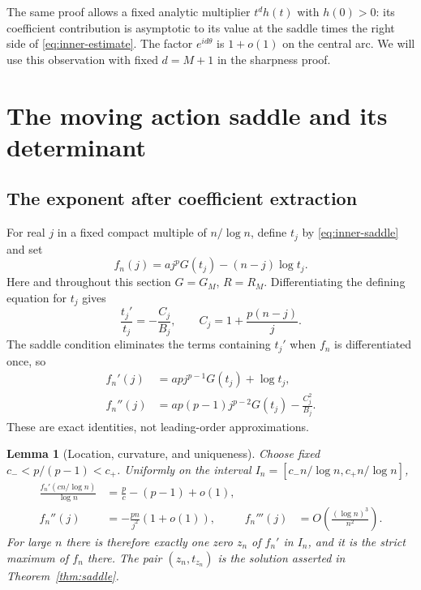 \documentclass[11pt,a4paper]{article}
\numberwithin{equation}{section}
\newtheorem{lemma}[theorem]{Lemma}
\theoremstyle{definition}
\theoremstyle{remark}
\begin{document}
The same proof allows a fixed analytic multiplier $t^d h(t)$ with
$h(0)>0$: its coefficient contribution is asymptotic to its value at the
saddle times the right side of \eqref{eq:inner-estimate}. The factor
$e^{id\theta}$ is $1+o(1)$ on the central arc. We will use this observation
with fixed $d=M+1$ in the sharpness proof.

\section{The moving action saddle and its determinant}
\label{sec:outer-saddle}

\subsection{The exponent after coefficient extraction}

For real $j$ in a fixed compact multiple of $n/\log n$, define $t_j$ by
\eqref{eq:inner-saddle} and set
\begin{equation}
 f_n(j)=a j^pG(t_j)-(n-j)\log t_j.
 \label{eq:outer-exponent}
\end{equation}
Here and throughout this section $G=G_M$, $R=R_M$.
Differentiating the defining equation for $t_j$ gives
\begin{equation}
 \frac{t_j'}{t_j}=-\frac{C_j}{B_j},
 \qquad C_j=1+\frac{p(n-j)}j.
 \label{eq:t-derivative}
\end{equation}
The saddle condition eliminates the terms containing $t_j'$ when
$f_n$ is differentiated once, so
\begin{align}
 f_n'(j)&=apj^{p-1}G(t_j)+\log t_j,\\
 f_n''(j)&=ap(p-1)j^{p-2}G(t_j)-\frac{C_j^2}{B_j}.
 \label{eq:f-derivatives}
\end{align}
These are exact identities, not leading-order approximations.

\begin{lemma}[Location, curvature, and uniqueness]
\label{lem:outer}
Choose fixed $c_-<p/(p-1)<c_+$. Uniformly on the interval
$I_n=[c_-n/\log n,c_+n/\log n]$,
\begin{align}
 \frac{f_n'(c n/\log n)}{\log n}
 &=\frac pc-(p-1)+o(1),\\
 f_n''(j)&=-\frac{pn}{j^2}(1+o(1)),
 & f_n'''(j)&=O\!\left(\frac{(\log n)^3}{n^2}\right).
 \label{eq:curvature}
\end{align}
For large $n$ there is therefore exactly one zero $z_n$ of $f_n'$ in
$I_n$, and it is the strict maximum of $f_n$ there.
The pair $(z_n,t_{z_n})$ is the solution asserted in
Theorem~\ref{thm:saddle}.
\end{lemma}
\end{document}
